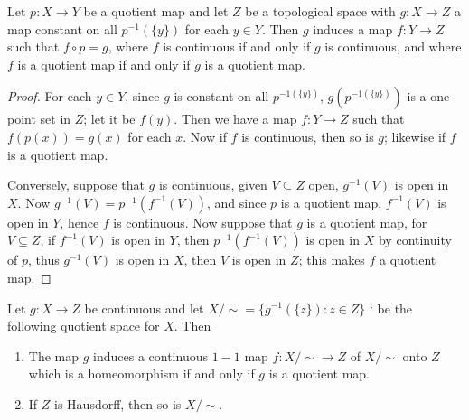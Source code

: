\begin{theorem}\label{2.4.5}
    Let $p:X \rightarrow Y$ be a quotient map and let  $Z$ be a topological space with  $g:X
    \rightarrow Z$ a map constant on all  $p^{-1}(\{y\})$ for each $y \in Y$. Then  $g$ induces a
    map $f:Y \rightarrow Z$ such that  $f \circ p=g$, where  $f$ is continuous if and only if  $g$
    is continuous, and where  $f$ is a quotient map if and only if  $g$ is a quotient map.
\end{theorem}
\begin{proof}
    For each $y \in Y$, since  $g$ is constant on all  $p^{-1(\{y\})}$, $g(p^{-1(\{y\})})$ is a one
    point set in $Z$; let it be $f(y)$. Then we have a map $f:Y \rightarrow Z$ such that
    $f(p(x))=g(x)$ for each $x$. Now if  $f$ is continuous, then so is  $g$; likewise if  $f$ is a
    quotient map.

    Conversely, suppose that  $g$ is continuous, given  $V \subseteq Z$ open,  $g^{-1}(V)$ is open
    in $X$. Now  $g^{-1}(V)=p^{-1}(f^{-1}(V))$, and since $p$ is a quotient map,  $f^{-1}(V)$ is
    open in $Y$, hence  $f$ is continuous. Now suppose that  $g$ is a quotient map, for  $V
    \subseteq Z$, if  $f^{-1}(V)$ is open in $Y$, then  $p^{-1}(f^{-1}(V))$ is open in $X$ by
    continuity of  $p$, thus  $g^{-1}(V)$ is open in $X$, then  $V$ is open in  $Z$; this makes  $f$
    a quotient map.
\end{proof}
\begin{corollary}
    Let $g:X \rightarrow Z$ be continuous and let $X/\sim=\{g^{-1}(\{z\}):z \in Z\}$ ` be the
    following quotient space for $X$. Then
        \begin{enumerate}[label=(\arabic*)]
            \item The map $g$ induces a continuous  $1-1$ map  $f:X/\sim \rightarrow Z$ of  $X/\sim$
                onto  $Z$ which is a homeomorphism if and only if $g$ is a quotient map.


            \item If $Z$ is Hausdorff, then so is  $X/\sim$.
        \end{enumerate}
\end{corollary}
